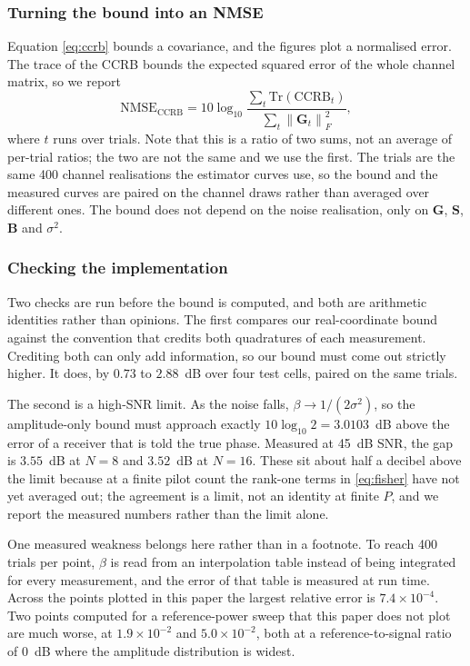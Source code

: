 \documentclass[journal]{IEEEtran}
\newcommand{\bG}{\mathbf{G}}
\newcommand{\bS}{\mathbf{S}}
\newcommand{\bB}{\mathbf{B}}
\begin{document}
\subsubsection{Turning the bound into an NMSE}

Equation \eqref{eq:ccrb} bounds a covariance, and the figures plot a normalised
error. The trace of the CCRB bounds the expected squared error of the whole
channel matrix, so we report
\begin{equation}
\mathrm{NMSE}_{\mathrm{CCRB}}
=10\log_{10}
\frac{\sum_{t}\mathrm{Tr}\left(\mathrm{CCRB}_t\right)}
{\sum_{t}\left\|\bG_t\right\|_F^2},
\label{eq:nmsedb}
\end{equation}
where $t$ runs over trials. Note that this is a ratio of two sums, not an
average of per-trial ratios; the two are not the same and we use the first. The
trials are the same 400 channel realisations the estimator curves use, so the
bound and the measured curves are paired on the channel draws rather than
averaged over different ones. The bound does not depend on the noise
realisation, only on $\bG$, $\bS$, $\bB$ and $\sigma^2$.

\subsubsection{Checking the implementation}

Two checks are run before the bound is computed, and both are arithmetic
identities rather than opinions.
The first compares our real-coordinate bound against the convention that
credits both quadratures of each measurement. Crediting both can only add
information, so our bound must come out strictly higher. It does, by $0.73$ to
$2.88$~dB over four test cells, paired on the same trials.

The second is a high-SNR limit. As the noise falls, $\beta\to1/(2\sigma^2)$, so
the amplitude-only bound must approach exactly $10\log_{10}2=3.0103$~dB above
the error of a receiver that is told the true phase. Measured at 45~dB SNR, the
gap is $3.55$~dB at $N=8$ and $3.52$~dB at $N=16$. These sit about half a
decibel above the limit because at a finite pilot count the rank-one terms in
\eqref{eq:fisher} have not yet averaged out; the agreement is a limit, not an
identity at finite $P$, and we report the measured numbers rather than the
limit alone.

One measured weakness belongs here rather than in a footnote. To reach 400
trials per point, $\beta$ is read from an interpolation table instead of being
integrated for every measurement, and the error of that table is measured at
run time.
Across the points plotted in this paper the largest relative error is
$7.4\times10^{-4}$. Two points computed for a reference-power sweep that this
paper does not plot are much worse, at $1.9\times10^{-2}$ and
$5.0\times10^{-2}$, both at a reference-to-signal ratio of $0$~dB where the
amplitude distribution is widest.
\end{document}
